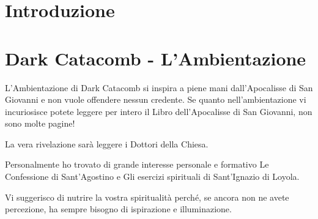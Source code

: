 \documentclass[12pt,a4paper,twoside,openany]{book}
\begin{document}








\section{Introduzione}

\pagebreak

\section{Dark Catacomb - L'Ambientazione}



\begin{narratore}
L'Ambientazione di Dark Catacomb si inspira a piene mani dall'Apocalisse di San Giovanni e non vuole offendere nessun credente. Se quanto nell'ambientazione vi incuriosisce potete leggere per intero il Libro dell'Apocalisse di San Giovanni, non sono molte pagine!
	
La  vera rivelazione sarà leggere i Dottori della Chiesa.
	
Personalmente ho trovato di grande interesse personale e formativo Le Confessione di Sant'Agostino e Gli esercizi spirituali di Sant'Ignazio di Loyola.
	
Vi suggerisco di nutrire la vostra spiritualità perché, se ancora non ne avete percezione, ha sempre bisogno di ispirazione e illuminazione.
	
\end{narratore}	
\end{document}
